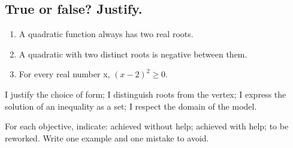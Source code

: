 \subsection*{True or false? Justify.}\label{C02-VF}
\begin{enumerate}
\item A quadratic function always has two real roots.
\item A quadratic with two distinct roots is negative between them.
\item For every real number x, $(x-2)^2\geq0$.
\end{enumerate}
\begin{keypoint}I justify the choice of form; I distinguish roots from the vertex; I express the solution of an inequality as a set; I respect the domain of the model.

For each objective, indicate: achieved without help; achieved with help; to be reworked. Write one example and one mistake to avoid.\end{keypoint}
\endgroup
\ifmxteacher{}\fi
